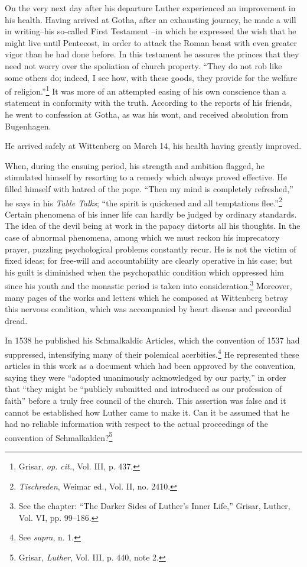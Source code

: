 On the very next day after his departure Luther experienced an
improvement in his health. Having arrived at Gotha, after an exhausting
journey, he made a will in writing--his so-called First Testament
--in which he expressed the wish that he might live until Pentecost, in
order to attack the Roman beast with even greater vigor
than he had done before. In this testament he assures the princes that
they need not worry over the spoliation of church property. “They
do not rob like some others do; indeed, I see how, with these goods,
they provide for the welfare of religion.”\footnote{Grisar, \textit{op. cit.}, Vol. III, p. 437.}
It was more of an attempted
easing of his own conscience than a statement in conformity
with the truth. According to the reports of his friends, he went to
confession at Gotha, as was his wont, and received absolution from
Bugenhagen.

He arrived safely at Wittenberg on March 14, his health having
greatly improved.

When, during the ensuing period, his strength and ambition
flagged, he stimulated himself by resorting to a remedy which always
proved effective. He filled himself with hatred of the pope. “Then
my mind is completely refreshed,” he says in his \textit{Table Talks}; “the
spirit is quickened and all temptations flee.”\footnote{\textit{Tischreden}, Weimar ed., Vol. II, no. 2410.}
Certain phenomena of
his inner life can hardly be judged by ordinary standards. The idea
of the devil being at work in the papacy distorts all his thoughts. In
the case of abnormal phenomena, among which we must reckon his
imprecatory prayer, puzzling psychological problems constantly recur.
He is not the victim of fixed ideas; for free-will and accountability
are clearly operative in his case; but his guilt is diminished when
the psychopathic condition which oppressed him since his youth and
the monastic period is taken into consideration.\footnote
{See the chapter: “The Darker Sides of Luther’s Inner Life,” Grisar, Luther, Vol. VI,
pp. 99--186.}
Moreover, many
pages of the works and letters which he composed at Wittenberg betray
this nervous condition, which was accompanied by heart disease
and precordial dread.

In 1538 he published his Schmalkaldic Articles, which the convention of
1537 had suppressed, intensifying many of their polemical
acerbities.\footnote{See \textit{supra}, n. 1.}
He represented these articles in this work as a document
which had been approved by the convention, saying they were
“adopted unanimously acknowledged by our party,” in order that
“they might be “publicly submitted and introduced as our profession
of faith” before a truly free council of the church. This assertion was
false and it cannot be established how Luther came to make it. Can it
be assumed that he had no reliable information with respect to the
actual proceedings of the convention of Schmalkalden?\footnote{Grisar, \textit{Luther}, Vol. III, p. 440, note 2.}


